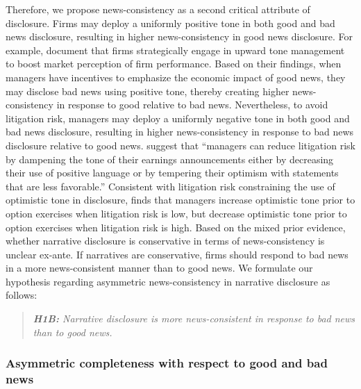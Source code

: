 \documentclass[letterpaper,12pt]{article}
\begin{document}
\begin{spacing}{1.5}
Therefore, we propose news-consistency as a second critical attribute of disclosure. Firms may deploy a uniformly positive tone in both good and bad news disclosure, resulting in higher news-consistency in good news disclosure. For example,  document that firms strategically engage in upward tone management to boost market perception of firm performance. Based on their findings, when managers have incentives to emphasize the economic impact of good news, they may disclose bad news using positive tone, thereby creating higher news-consistency in response to good relative to bad news. Nevertheless, to avoid litigation risk, managers may deploy a uniformly negative tone in both good and bad news disclosure, resulting in higher news-consistency in response to bad news disclosure relative to good news.  suggest that ``managers can reduce litigation risk by dampening the tone of their earnings announcements either by decreasing their use of positive language or by tempering their optimism with statements that are less favorable.'' Consistent with litigation risk constraining the use of optimistic tone in disclosure,  finds that managers increase optimistic tone prior to option exercises when litigation risk is low, but decrease optimistic tone prior to option exercises when litigation risk is high. Based on the mixed prior evidence, whether narrative disclosure is conservative in terms of news-consistency is unclear ex-ante. If narratives are conservative, firms should respond to bad news in a more news-consistent manner than to good news. We formulate our hypothesis regarding asymmetric news-consistency in narrative disclosure as follows:

\begin{quote}\label{hyp:h1b}
	\textit{\textbf{H1B:} Narrative disclosure is more news-consistent in response to bad news than to good news.}
\end{quote}

\subsubsection{Asymmetric completeness with respect to good and bad news}


\end{spacing}
\end{document}
